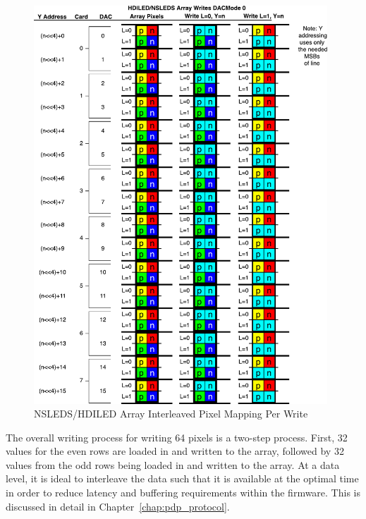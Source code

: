     \begin{figure}
        \centering
        \includegraphics[width=0.98\textwidth]{fig/nsleds_hdiled_array_writing.pdf}
        \caption{NSLEDS/HDILED Array Interleaved Pixel Mapping Per Write}
        \label{fig:nsleds_hdiled_array_interleaved_pixel_mapping_per_write}
    \end{figure}

    The overall writing process for writing 64 pixels is a two-step process. First, 32 values for the even rows are loaded in and written to the array, followed by 32 values from the odd rows being loaded in and written to the array. At a data level, it is ideal to interleave the data such that it is available at the optimal time in order to reduce latency and buffering requirements within the firmware. This is discussed in detail in Chapter~\ref{chap:pdp_protocol}.

